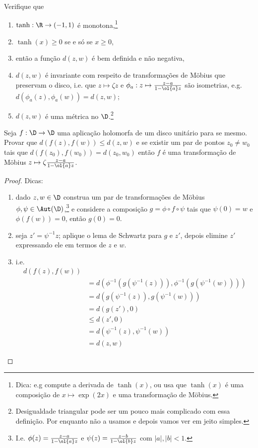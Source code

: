 \begin{problema}
Verifique que 
\begin{enumerate}
\item $\tanh: \R \to (-1,1)$ é monotona,\footnote{Dica:
e.g compute a derivada de $\tanh(x)$, ou usa que $\tanh(x)$
é uma composição de $x\mapsto \exp(2x)$ e uma transformação de Möbius.}
\item $\tanh(x)\geq 0$ se e só se $x\geq 0$,
\item então a função $d(z,w)$ é bem definida e não negativa,
\item $d(z,w)$ é invariante com respeito
de transformações de Möbius que preservam o disco,
i.e. que $z\mapsto \zeta z$ e $\phi_a: z\mapsto \frac{z-a}{1-\ol{a} z}$ são isometrias,
e.g. $d(\phi_a(z),\phi_a(w)) = d(z,w)$;
\item $d(z,w)$ é uma métrica no $\D$.\footnote{Desigualdade triangular pode
ser um pouco mais complicado com essa definição. Por enquanto não a usamos e depois
vamos ver em jeito simples.}
\end{enumerate}
\end{problema}

\begin{problema}
Seja $f : \D \to \D$ uma aplicação holomorfa de um disco unitário para se mesmo.
Provar que $d(f(z),f(w)) \leq d(z,w)$ e se existir um par de pontos $z_0\neq w_0$ tais que
$d(f(z_0),f(w_0)) = d(z_0,w_0)$ então $f$ é uma transformação de Möbius
$z \mapsto \zeta \frac{z-a}{1-\ol{a} z}$.
\end{problema}
\begin{proof}
Dicas:
\begin{enumerate}
\item dado $z,w \in \D$ construa um par
de  transformações de Möbius $\phi,\psi\in\Aut(\D)$,\footnote{I.e.
$\phi(z) = \frac{z-a}{1-\ol{a}z}$
e $\psi(z) = \frac{z-b}{1-\ol{b}z}$ com $|a|,|b|<1$.}
e considere a composição $g = \phi \circ f \circ \psi$ tais que
$\psi(0) = w$ e $\phi(f(w)) = 0$, então $g(0) = 0$.
\item seja $z'= \psi^{-1} z$; aplique o lema de Schwartz para $g$ e $z'$,
depois elimine $z'$ expressando ele em termos de $z$ e $w$.
\item i.e.
\begin{align*}
d(f(z),f(w)) \\
&= d(\phi^{-1}(g(\psi^{-1}(z))), \phi^{-1}(g(\psi^{-1}(w)))) \\
&= d(g(\psi^{-1}(z)), g(\psi^{-1}(w))) \\
&= d(g(z'),0) \\
&\leq d(z',0) \\
&= d(\psi^{-1}(z), \psi^{-1}(w)) \\
&= d(z,w)
\end{align*}
\end{enumerate}
\end{proof}

